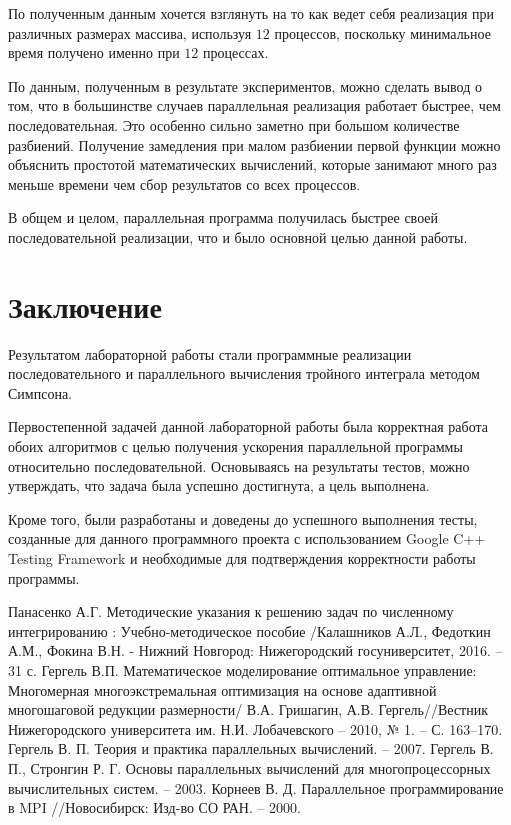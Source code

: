 \documentclass{report}
\begin{document}
\par По полученным данным хочется взглянуть на то как ведет себя реализация при различных размерах массива, используя $12$ процессов, поскольку минимальное время получено именно при $12$ процессах.
\newpage

\par По данным, полученным в результате экспериментов, можно сделать вывод о том, что в большинстве случаев параллельная реализация работает быстрее, чем последовательная. Это особенно сильно заметно при большом количестве разбиений. Получение замедления при малом разбиении первой функции можно объяснить простотой математических вычислений, которые занимают много раз меньше времени чем сбор результатов со всех процессов.
\par В общем и целом, параллельная программа получилась быстрее своей последовательной реализации, что и было основной целью данной работы.

\newpage

\section*{Заключение}
Результатом лабораторной работы стали программные реализации последовательного и параллельного вычисления тройного интеграла методом Симпсона.
\par Первостепенной задачей данной лабораторной работы была корректная работа обоих алгоритмов с целью получения ускорения параллельной программы относительно последовательной. Основываясь на результаты тестов, можно утверждать, что задача была успешно достигнута, а цель выполнена.
\par Кроме того, были разработаны и доведены до успешного выполнения тесты, созданные для данного программного проекта с использованием Google C++ Testing Framework и необходимые для подтверждения корректности работы программы.

\newpage

\begin{thebibliography}{1}
Панасенко А.Г. Методические указания к решению задач по
численному интегрированию : Учебно-методическое пособие /Калашников А.Л., Федоткин А.М., Фокина В.Н. - Нижний Новгород: Нижегородский госуниверситет, 2016. – 31 с.
Гергель В.П. Математическое моделирование
оптимальное управление: Многомерная многоэкстремальная оптимизация на основе адаптивной многошаговой редукции размерности/ В.А. Гришагин, А.В. Гергель//Вестник Нижегородского университета им. Н.И. Лобачевского – 2010, № 1. –  С. 163–170.
Гергель В. П. Теория и практика параллельных вычислений. – 2007.
Гергель В. П., Стронгин Р. Г. Основы параллельных вычислений для многопроцессорных вычислительных систем. – 2003.
Корнеев В. Д. Параллельное программирование в MPI //Новосибирск: Изд-во СО РАН. – 2000.

\end{thebibliography}
\newpage
\end{document}
